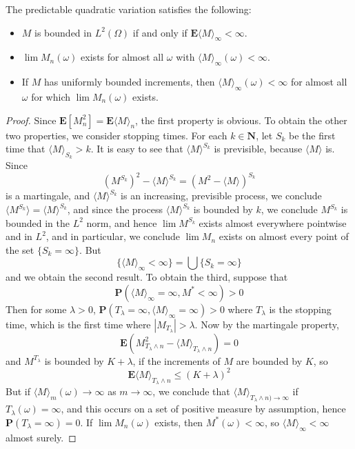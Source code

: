 \begin{theorem}
    The predictable quadratic variation satisfies the following:
    \begin{itemize}
        \item $M$ is bounded in $L^2(\Omega)$ if and only if $\mathbf{E} \langle M \rangle_\infty < \infty$.

        \item $\lim M_n(\omega)$ exists for almost all $\omega$ with $\langle M \rangle_\infty(\omega) < \infty$.

        \item If $M$ has uniformly bounded increments, then $\langle M \rangle_\infty(\omega) < \infty$ for almost all $\omega$ for which $\lim M_n(\omega)$ exists.
    \end{itemize}
\end{theorem}
\begin{proof}
    Since $\mathbf{E}[M_n^2] = \mathbf{E}\langle M \rangle_n$, the first property is obvious. To obtain the other two properties, we consider stopping times. For each $k \in \mathbf{N}$, let $S_k$ be the first time that $\langle M \rangle_{S_k} > k$. It is easy to see that $\langle M \rangle^{S_k}$ is previsible, because $\langle M \rangle$ is. Since
    \[ (M^{S_k})^2 - \langle M \rangle^{S_k} = (M^2 - \langle M \rangle)^{S_k} \]
    is a martingale, and $\langle M \rangle^{S_k}$ is an increasing, previsible process, we conclude $\langle M^{S_k} \rangle = \langle M \rangle^{S_k}$, and since the process $\langle M \rangle^{S_k}$ is bounded by $k$, we conclude $M^{S_k}$ is bounded in the $L^2$ norm, and hence $\lim M^{S_k}$ exists almost everywhere pointwise and in $L^2$, and in particular, we conclude $\lim M_n$ exists on almost every point of the set $\{ S_k = \infty \}$. But
    \[ \{ \langle M \rangle_\infty < \infty \} = \bigcup \{ S_k = \infty \} \]
    and we obtain the second result. To obtain the third, suppose that
    \[ \mathbf{P}(\langle M \rangle_\infty = \infty, M^* < \infty) > 0 \]
    Then for some $\lambda > 0$, $\mathbf{P}(T_\lambda = \infty, \langle M \rangle_\infty = \infty) > 0$ where $T_\lambda$ is the stopping time, which is the first time where $|M_{T_\lambda}| > \lambda$. Now by the martingale property,
    \[ \mathbf{E}(M_{T_\lambda \wedge n}^2 - \langle M \rangle_{T_\lambda \wedge n}) = 0 \]
    and $M^{T_\lambda}$ is bounded by $K + \lambda$, if the increments of $M$ are bounded by $K$, so
    \[ \mathbf{E} \langle M \rangle_{T_\lambda \wedge n} \leq (K + \lambda)^2 \]
    But if $\langle M \rangle_m(\omega) \to \infty$ as $m \to \infty$, we conclude that $\langle M \rangle_{T_\lambda \wedge n) \to \infty}$ if $T_\lambda(\omega) = \infty$, and this occurs on a set of positive measure by assumption, hence $\mathbf{P}(T_\lambda = \infty) = 0$. If $\lim M_n(\omega)$ exists, then $M^*(\omega) < \infty$, so $\langle M \rangle_\infty < \infty$ almost surely.
\end{proof}

